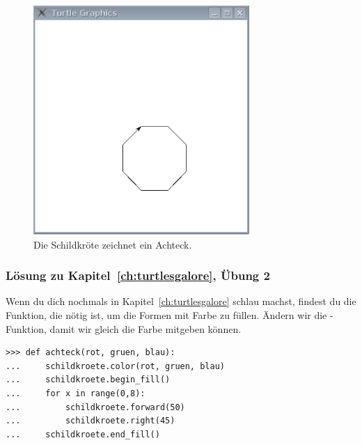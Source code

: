 \begin{figure}
\begin{center}
\includegraphics[width=82mm]{images/figure48}
\end{center}
\caption{Die Schildkröte zeichnet ein Achteck.}\label{fig48}
\end{figure}

\noindent
\subsubsection{Lösung zu Kapitel~\ref{ch:turtlesgalore}, Übung 2}
Wenn du dich nochmals in Kapitel~\ref{ch:turtlesgalore} schlau machst, findest du die Funktion, die nötig ist, um die Formen mit Farbe zu füllen. Ändern wir die -Funktion, damit wir gleich die Farbe mitgeben können.

\begin{Verbatim}[frame=single]
>>> def achteck(rot, gruen, blau):
...     schildkroete.color(rot, gruen, blau)
...     schildkroete.begin_fill()
...     for x in range(0,8):
...         schildkroete.forward(50)
...         schildkroete.right(45)
...     schildkroete.end_fill()
\end{Verbatim}

